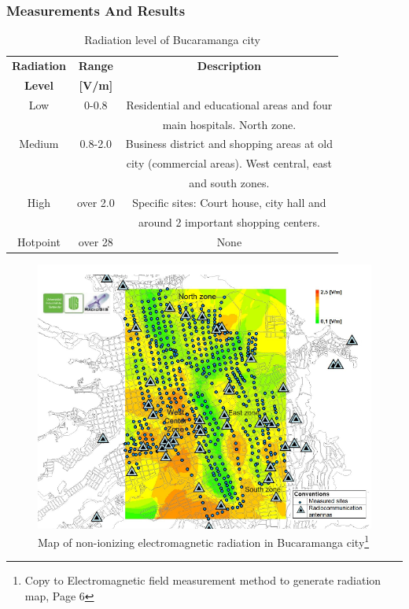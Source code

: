\documentclass[xcolor=svgnames]{beamer}
\begin{document}
\begin{frame}
 \frametitle{Measurements And Results}
 \begin{table}[H]
	\centering
\begin{tabular}{|c|c|c|}\hline
\textbf{Radiation} & \textbf{Range} & \textbf{Description} \\
\textbf{Level} & \textbf{[V/m]} & \\ \hline
Low & 0-0.8 & Residential and educational areas and four \\
 &  & main hospitals. North zone. \\ \hline
Medium & 0.8-2.0 & Business district and shopping areas at old\\
 &  & city (commercial areas). West central, east\\
&  & and south zones. \\ \hline
High & over 2.0 & Specific sites: Court house, city hall and\\
 &  & around 2 important shopping centers. \\ \hline
Hotpoint & over 28 & None \\ \hline
    \end{tabular}
	\caption{Radiation level of Bucaramanga city}
	\label{tab2}
\end{table}
\end{frame}

\begin{frame}
 \begin{figure}[H]
    \includegraphics[scale=0.31]{city.png}
      \caption{Map of non-ionizing electromagnetic radiation in Bucaramanga city\footnote{Copy to Electromagnetic field measurement method to generate radiation map, Page 6}}
    \end{figure}
\end{frame}
\end{document}
